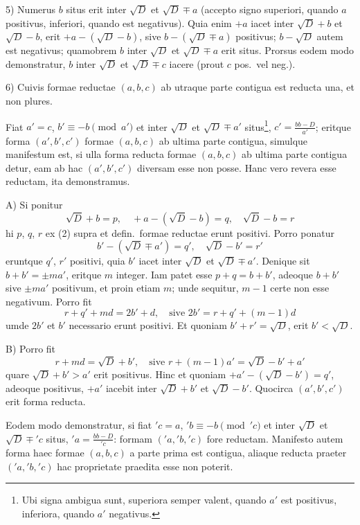 \documentclass[12pt,a4paper]{article}
\theoremstyle{plain}
\begin{document}
5) Numerus $b$ situs erit inter $\sqrt{D}$ et $\sqrt{D} \mp a$ (accepto signo superiori, quando $a$ positivus, inferiori, quando est negativus). Quia enim $+a$ iacet inter $\sqrt{D} + b$ et $\sqrt{D} - b$, erit $+a - (\sqrt{D} - b)$, sive $b - (\sqrt{D} \mp a)$ positivus; $b - \sqrt{D}$ autem est negativus; quamobrem $b$ inter $\sqrt{D}$ et $\sqrt{D} \mp a$ erit situs. Prorsus eodem modo demonstratur, $b$ inter $\sqrt{D}$ et $\sqrt{D} \mp c$ iacere (prout $c$ pos.~vel neg.).

6) Cuivis formae reductae $(a,b,c)$ ab utraque parte contigua est reducta una, et non plures.

Fiat $a' = c$, $b' \equiv -b \pmod{a'}$ et inter $\sqrt{D}$ et $\sqrt{D} \mp a'$ situs\footnote{Ubi signa ambigua sunt, superiora semper valent, quando $a'$ est positivus, inferiora, quando $a'$ negativus.}, $c' = \frac{bb - D}{a'}$; eritque forma $(a', b', c')$ formae $(a,b,c)$ ab ultima parte contigua, simulque manifestum est, si ulla forma reducta formae $(a,b,c)$ ab ultima parte contigua detur, eam ab hac $(a', b', c')$ diversam esse non posse. Hanc vero revera esse reductam, ita demonstramus.

A) Si ponitur
\[
\sqrt{D} + b = p, \quad +a - (\sqrt{D} - b) = q, \quad \sqrt{D} - b = r
\]
hi $p$, $q$, $r$ ex (2) supra et defin.~formae reductae erunt positivi. Porro ponatur
\[
b' - (\sqrt{D} \mp a') = q', \quad \sqrt{D} - b' = r'
\]
eruntque $q'$, $r'$ positivi, quia $b'$ iacet inter $\sqrt{D}$ et $\sqrt{D} \mp a'$. Denique sit $b + b' = \pm ma'$, eritque $m$ integer. Iam patet esse $p + q = b + b'$, adeoque $b + b'$ sive $\pm ma'$ positivum, et proin etiam $m$; unde sequitur, $m - 1$ certe non esse negativum. Porro fit
\[
r + q' + md = 2b' + d, \quad \text{sive } 2b' = r + q' + (m - 1)d
\]
umde $2b'$ et $b'$ necessario erunt positivi. Et quoniam $b' + r' = \sqrt{D}$, erit $b' < \sqrt{D}$.

B) Porro fit
\[
r + md = \sqrt{D} + b', \quad \text{sive } r + (m - 1)a' = \sqrt{D} - b' + a'
\]
quare $\sqrt{D} + b' > a'$ erit positivus. Hinc et quoniam $+a' - (\sqrt{D} - b') = q'$, adeoque positivus, $+a'$ iacebit inter $\sqrt{D} + b'$ et $\sqrt{D} - b'$. Quocirca $(a', b', c')$ erit forma reducta.

Eodem modo demonstratur, si fiat $'c = a$, $'b \equiv -b \pmod{'c}$ et inter $\sqrt{D}$ et $\sqrt{D} \mp 'c$ situs, $'a = \frac{bb - D}{'c}$: formam $('a, 'b, 'c)$ fore reductam. Manifesto autem forma haec formae $(a,b,c)$ a parte prima est contigua, aliaque reducta praeter $('a, 'b, 'c)$ hac proprietate praedita esse non poterit.
\end{document}

